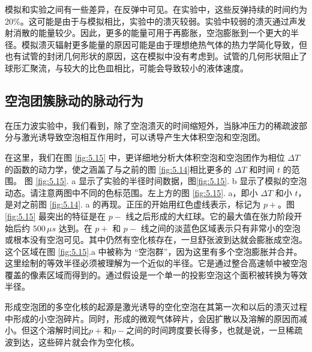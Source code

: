模拟和实验之间有一些差异，在反弹中可见。在实验中，这些反弹持续的时间约为20\%。这可能是由于与模拟相比，实验中的溃灭较弱。实验中较弱的溃灭通过声发射消散的能量较少。因此，更多的能量可用于再膨胀，空泡膨胀到一个更大的半径。模拟溃灭辐射更多能量的原因可能是由于理想绝热气体的热力学简化导致，但也有试管的封闭几何形状的原因，这在模拟中没有考虑到。试管的几何形状阻止了球形汇聚流，与较大的比色皿相比，可能会导致较小的液体速度。

\subsection{空泡团簇脉动的脉动行为}
在压力波实验中，我们看到，除了空泡溃灭的时间缩短外，当脉冲压力的稀疏波部分与激光诱导致空泡相互作用时，可以诱导产生大体积空泡和空泡团。

在这里，我们在图 \ref{fig:5.15} 中，更详细地分析大体积空泡和空泡团作为相位
$\Delta T$ 的函数的动力学，使之涵盖了与之前的图 \ref{fig:5.14}相比更多的
$\Delta T$ 和时间 $t$ 的范围。 图 \ref{fig:5.15}. a
显示了实验的半径时间数据，图\ref{fig:5.15}. b
显示了模拟的空泡动态。请注意两图中不同的色标范围。左上方的图 \ref{fig:5.15}.
a，即小 $\Delta T$ 和小 $t$，是对之前图 \ref{fig:5.14}. a
的再现。正压的开始用红色虚线表示，标记为 $p+$。图\ref{fig:5.15}
最突出的特征是在 $p-$ 线之后形成的大红球。它的最大值在张力阶段开始后约
$500\, \mu s$ 达到。在 $p+$ 和 $p-$
线之间的淡蓝色区域表示只有非常小的空泡或根本没有空泡可见。其中仍然有空化核存在，一旦舒张波到达就会膨胀成空泡。这个区域在图
\ref{fig:5.15}.a 中被称为
``空泡群''，因为这里有多个空泡膨胀并合并。这里绘制的等效半径必须被理解为一个近似的半径。它是通过整合高速帧中被空泡覆盖的像素区域而得到的。通过假设是一个单一的投影空泡这个面积被转换为等效半径。

形成空泡团的多空化核的起源是激光诱导的空化空泡在其第一次和以后的溃灭过程中形成的小空泡碎片。同时，形成的微观气体碎片，会因扩散以及溶解的原因而减小。但这个溶解时间比$p+$和$p-$之间的时间跨度要长得多，也就是说，一旦稀疏波到达，这些碎片就会作为空化核。

